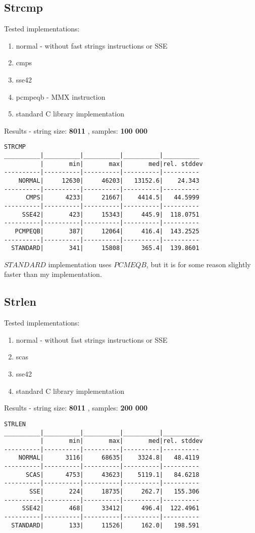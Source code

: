\documentclass[11pt,a4paper]{article}
\begin{document}
\subsection{Strcmp}\label{subsec:strcmp}
    Tested implementations:
    \begin{enumerate}
        \item normal - without fast strings instructions or SSE
        \item cmps
        \item sse42
        \item pcmpeqb - MMX instruction
        \item standard C library implementation
    \end{enumerate}
Results - string size: \textbf{8011} , samples: \textbf{100 000}
\begin{lstlisting}[]
STRCMP
__________|__________|__________|__________|__________
          |       min|       max|       med|rel. stddev
----------|----------|----------|----------|----------
    NORMAL|     12630|     46203|   13152.6|    24.343
----------|----------|----------|----------|----------
      CMPS|      4233|     21667|    4414.5|   44.5999
----------|----------|----------|----------|----------
     SSE42|       423|     15343|     445.9|  118.0751
----------|----------|----------|----------|----------
   PCMPEQB|       387|     12064|     416.4|  143.2525
----------|----------|----------|----------|----------
  STANDARD|       341|     15808|     365.4|  139.8601
\end{lstlisting}
$STANDARD$ implementation uses $PCMEQB$, but it is for some reason slightly faster than my implementation.



\subsection{Strlen}\label{subsec:strlen}
    Tested implementations:
    \begin{enumerate}
        \item normal - without fast strings instructions or SSE
        \item scas
        \item sse42
        \item standard C library implementation
    \end{enumerate}
Results - string size: \textbf{8011} , samples: \textbf{200 000}
\begin{lstlisting}[]
STRLEN
__________|__________|__________|__________|__________
          |       min|       max|       med|rel. stddev
----------|----------|----------|----------|----------
    NORMAL|      3116|     68635|    3324.8|   48.4119
----------|----------|----------|----------|----------
      SCAS|      4753|     43623|    5119.1|   84.6218
----------|----------|----------|----------|----------
       SSE|       224|     18735|     262.7|   155.306
----------|----------|----------|----------|----------
     SSE42|       468|     33412|     496.4|  122.4961
----------|----------|----------|----------|----------
  STANDARD|       133|     11526|     162.0|   198.591
\end{lstlisting}
\end{document}
